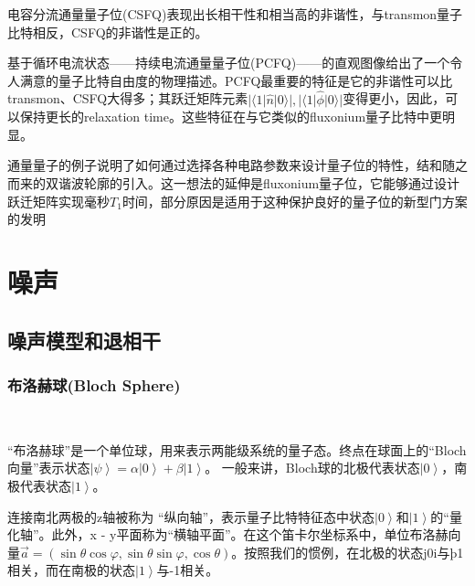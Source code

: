 \documentclass[12pt, a4paper, oneside]{ctexbook}
\newcounter{#2}
\newcounter{#2}[#1]
\numberwithin{#2}{#1}
\newcommand{\ket}[1]{\left| #1 \right\rangle}
\begin{document}
            \begin{theorem}
              电容分流通量量子位(CSFQ)表现出长相干性和相当高的非谐性，与transmon量子比特相反，CSFQ的非谐性是正的。

              基于循环电流状态——持续电流通量量子位(PCFQ)——的直观图像给出了一个令人满意的量子比特自由度的物理描述。PCFQ最重要的特征是它的非谐性可以比transmon、CSFQ大得多；其跃迁矩阵元素\(|\langle 1|\hat{n}| 0\rangle|,|\langle 1|\hat{\phi}| 0\rangle|\)变得更小，因此，可以保持更长的relaxation time。这些特征在与它类似的fluxonium量子比特中更明显。
            \end{theorem}
            \begin{theorem}
              通量量子的例子说明了如何通过选择各种电路参数来设计量子位的特性，结和随之而来的双谐波轮廓的引入。这一想法的延伸是fluxonium量子位，它能够通过设计跃迁矩阵实现毫秒\(T_1\)时间，部分原因是适用于这种保护良好的量子位的新型门方案的发明
            \end{theorem}

            \chapter{噪声}

            \section{噪声模型和退相干}
            \subsection{布洛赫球(Bloch Sphere)}\
            \begin{define}
              “布洛赫球”是一个单位球，用来表示两能级系统的量子态。终点在球面上的“Bloch向量”表示状态\(\ket{\psi}=\alpha\ket0+\beta\ket1\)。
              一般来讲，Bloch球的北极代表状态\(\ket0\)，南极代表状态\(\ket1\)。


              连接南北两极的z轴被称为
              “纵向轴”，表示量子比特特征态中状态\(\ket0\)和\(\ket1\)的“量化轴”。此外，x - y平面称为“横轴平面”。在这个笛卡尔坐标系中，单位布洛赫向量\(\vec a=(\sin\theta\cos\varphi,\sin\theta\sin\varphi,\cos\theta)\)。按照我们的惯例，在北极的状态j0i与þ1相关，而在南极的状态\(\ket1\)与-1相关。
            \end{define}
        
        
        
\end{document}

